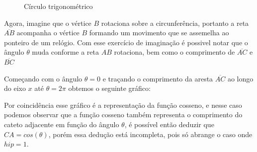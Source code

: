 \begin{multicols*}{2}
    \begin{figure}[H]
        \centering
        \caption{Círculo trigonométrico}
        \label{fig:circ_trig}
    \end{figure}

    Agora, imagine que o vértice $B$ rotaciona sobre a circunferência, portanto
    a reta $\overline{AB}$ acompanha o vértice $B$ formando um movimento que se assemelha
    ao ponteiro de um relógio. Com esse exercício de imaginação é possivel notar
    que o ângulo $\theta$ muda conforme a reta $AB$ rotaciona, bem como o
    comprimento de $\overline{AC}$ e $\overline{BC}$

    Começando com o ângulo $\theta=0$ e traçando o comprimento da aresta $\overline{AC}$
    ao longo do eixo $x$ até $\theta=2\pi$ obtemos o seguinte gráfico:

    \begin{figure}[H]
        \centering
    \end{figure}


    Por coincidência esse gráfico é a representação da função cosseno,
    e nesse caso podemos observar que a função cosseno também representa o
    comprimento do cateto adjacente em função do ângulo $\theta$, é possível
    então deduzir que $CA = cos(\theta)$, porém essa dedução está incompleta,
    pois só abrange o caso onde $hip = 1$.


\end{multicols*}
